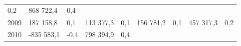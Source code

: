 \begin{longtable}[]{@{}lllllllll@{}}
\begin{minipage}[t]{0.06\columnwidth}
0,2\strut
\end{minipage} & \begin{minipage}[t]{0.10\columnwidth}\raggedright
868 722,4\strut
\end{minipage} & \begin{minipage}[t]{0.06\columnwidth}\raggedright
0,4\strut
\end{minipage}\tabularnewline
\begin{minipage}[t]{0.05\columnwidth}\raggedright
2009\strut
\end{minipage} & \begin{minipage}[t]{0.10\columnwidth}\raggedright
187 158,8\strut
\end{minipage} & \begin{minipage}[t]{0.06\columnwidth}\raggedright
0,1\strut
\end{minipage} & \begin{minipage}[t]{0.16\columnwidth}\raggedright
113 377,3\strut
\end{minipage} & \begin{minipage}[t]{0.06\columnwidth}\raggedright
0,1\strut
\end{minipage} & \begin{minipage}[t]{0.12\columnwidth}\raggedright
156 781,2\strut
\end{minipage} & \begin{minipage}[t]{0.06\columnwidth}\raggedright
0,1\strut
\end{minipage} & \begin{minipage}[t]{0.10\columnwidth}\raggedright
457 317,3\strut
\end{minipage} & \begin{minipage}[t]{0.06\columnwidth}\raggedright
0,2\strut
\end{minipage}\tabularnewline
\begin{minipage}[t]{0.05\columnwidth}\raggedright
2010\strut
\end{minipage} & \begin{minipage}[t]{0.10\columnwidth}\raggedright
-835 583,1\strut
\end{minipage} & \begin{minipage}[t]{0.06\columnwidth}\raggedright
-0,4\strut
\end{minipage} & \begin{minipage}[t]{0.16\columnwidth}\raggedright
798 394,9\strut
\end{minipage} & \begin{minipage}[t]{0.06\columnwidth}\raggedright
0,4\strut
\end{minipage} & \begin{minipage}[t]{0.12\columnwidth}\raggedright

\end{minipage}
\end{longtable}
